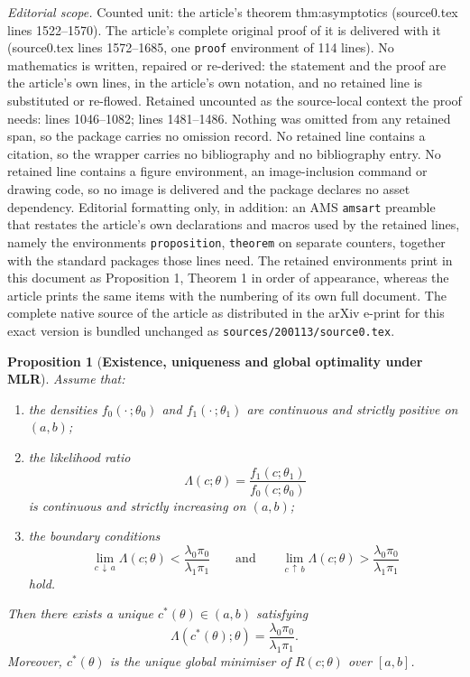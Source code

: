\documentclass[10pt,a4paper]{amsart}
\newtheorem{proposition}{Proposition}
\begin{document}
\noindent\textit{Editorial scope.} Counted unit: the article's theorem thm:asymptotics (source0.tex lines 1522--1570). The article's complete original proof of it is delivered with it (source0.tex lines 1572--1685, one \texttt{proof} environment of 114 lines). No mathematics is written, repaired or re-derived: the statement and the proof are the article's own lines, in the article's own notation, and no retained line is substituted or re-flowed.  Retained uncounted as the source-local context the proof needs: lines 1046--1082; lines 1481--1486.  Nothing was omitted from any retained span, so the package carries no omission record.  No retained line contains a citation, so the wrapper carries no bibliography and no bibliography entry.  No retained line contains a figure environment, an image-inclusion command or drawing code, so no image is delivered and the package declares no asset dependency.  Editorial formatting only, in addition: an AMS \texttt{amsart} preamble that restates the article's own declarations and macros used by the retained lines, namely the environments \texttt{proposition}, \texttt{theorem} on separate counters, together with the standard packages those lines need.  The retained environments print in this document as Proposition 1, Theorem 1 in order of appearance, whereas the article prints the same items with the numbering of its own full document.  The complete native source of the article as distributed in the arXiv e-print for this exact version is bundled unchanged as \texttt{sources/200113/source0.tex}.
\begin{proposition}[\textbf{Existence, uniqueness and global optimality under MLR}]
\label{prop:optimal-cutoff}
Assume that:
\begin{enumerate}
    \item the densities $f_0(\cdot\,;\theta_0)$ and
          $f_1(\cdot\,;\theta_1)$ are continuous and strictly
          positive on $(a,b)$;

    \item the likelihood ratio
          \[
          \Lambda(c;\theta)
          =
          \frac{f_1(c;\theta_1)}{f_0(c;\theta_0)}
          \]
          is continuous and strictly increasing on $(a,b)$;

    \item the boundary conditions
          \[
          \lim_{c\,\downarrow\,a}\Lambda(c;\theta)
          <
          \frac{\lambda_0\pi_0}{\lambda_1\pi_1}
          \qquad\text{and}\qquad
          \lim_{c\,\uparrow\,b}\Lambda(c;\theta)
          >
          \frac{\lambda_0\pi_0}{\lambda_1\pi_1}
          \]
          hold.
\end{enumerate}
Then there exists a unique $c^*(\theta)\in(a,b)$ satisfying
\[
\Lambda(c^*(\theta);\theta)
=
\frac{\lambda_0\pi_0}{\lambda_1\pi_1}.
\]
Moreover, $c^*(\theta)$ is the unique global minimiser of
$R(c;\theta)$ over $[a,b]$.
\end{proposition}
\end{document}
